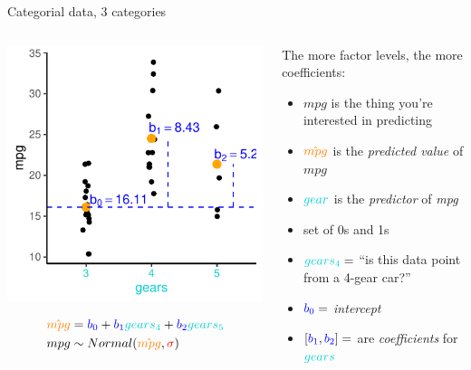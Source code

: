 \documentclass[
  ignorenonframetext,
  aspectratio=169]{beamer}
\providecommand{\tightlist}{%
  \setlength{\itemsep}{0pt}\setlength{\parskip}{0pt}}
\begin{document}
\begin{frame}{Categorial data, 3 categories}
\protect\hypertarget{categorial-data-3-categories}{}
\begin{columns}[T]
\begin{column}{0.48\textwidth}
\includegraphics{03-Lecture_files/figure-beamer/unnamed-chunk-9-1.pdf}

\begin{equation*} 
\begin{split}
\textcolor{orange}{\hat{mpg}} & = \textcolor{blue}{b_0} + \textcolor{blue}{b_1}\textcolor{darkturquoise}{gears_4} + \textcolor{blue}{b_2}\textcolor{darkturquoise}{gears_5} \\
mpg & \sim Normal(\textcolor{orange}{\hat{mpg}},\textcolor{red}{\sigma})
\end{split}
\end{equation*}
\end{column}

\begin{column}{0.48\textwidth}
The more factor levels, the more coefficients:

\begin{itemize}
\tightlist
\item
  \(mpg\) is the thing you're interested in predicting
\item
  \(\textcolor{orange}{\hat{mpg}}\) is the \emph{predicted value} of
  \(mpg\)
\item
  \(\textcolor{darkturquoise}{gear}\) is the \emph{predictor} of
  \emph{mpg}
\item
  set of 0s and 1s
\item
  \(\textcolor{darkturquoise}{gears_4}=\) ``is this data point from a
  4-gear car?''
\item
  \(\textcolor{blue}{b_0}=\) \emph{intercept}
\item
  \([\textcolor{blue}{b_1},\textcolor{blue}{b_2}]=\) are
  \emph{coefficients} for \(\textcolor{darkturquoise}{gears}\)
\end{itemize}
\end{column}
\end{columns}
\end{frame}
\end{document}
